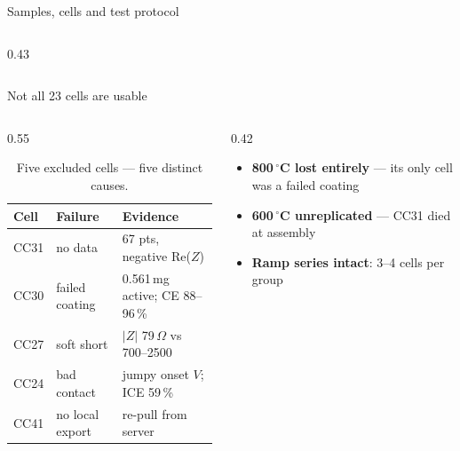 \begin{frame}{Samples, cells and test protocol}
\begin{columns}[T]
\begin{column}{0.43\textwidth}
    \end{column}
  \end{columns}
\end{frame}

\begin{frame}{Not all 23 cells are usable}
  \begin{columns}[T]
    \begin{column}{0.55\textwidth}
      \begin{table}
        \centering
        \scriptsize
        \begin{tabular}{@{}lll@{}}
          \toprule
          \textbf{Cell} & \textbf{Failure} & \textbf{Evidence} \\
          \midrule
          CC31 & no data      & 67 pts, negative Re(\(Z\)) \\
          CC30 & failed coating & 0.561\,mg active; CE 88--96\,\% \\
          CC27 & soft short   & \(\vert Z\vert\) 79\,\(\Omega\) vs 700--2500 \\
          CC24 & bad contact  & jumpy onset \(V\); ICE 59\,\% \\
          CC41 & no local export & re-pull from server \\
          \bottomrule
        \end{tabular}
        \caption{Five excluded cells --- five distinct causes.}\label{tab:bad}
      \end{table}
    \end{column}
    \begin{column}{0.42\textwidth}
      \begin{itemize}
        \item \textbf{800\,\({^\circ}\)C lost entirely} --- its only cell was
              a failed coating
        \item \textbf{600\,\({^\circ}\)C unreplicated} --- CC31 died at assembly
        \item \textbf{Ramp series intact}: 3--4 cells per group

\end{itemize}
\end{column}
\end{columns}
\end{frame}
